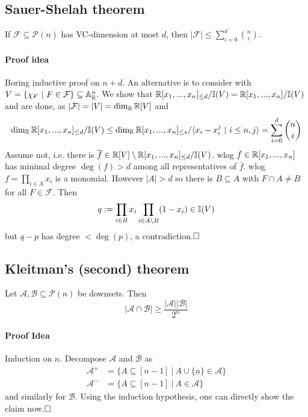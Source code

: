 \subsection{Sauer-Shelah theorem}
If $\mathcal{F} \subseteq \mathcal{P}(n)$ has VC-dimension at most $d$, then $|\mathcal{F}| \leq \sum_{i = 0}^d {n \choose i}$.
\paragraph{Proof idea} Boring inductive proof on $n + d$. An alternative is to consider with $V = \{ \chi_F \ | \ F \in \mathcal{F} \} \subseteq \mathbb{A}^n_{\mathbb{R}}$.
We show that $\mathbb{R}[x_1, ..., x_n]_{\leq d} / \mathbb{I}(V) = \mathbb{R}[x_1, ..., x_n] / \mathbb{I}(V)$ and are done, as $|\mathcal{F}| = |V| = \dim_{\mathbb{R}} \mathbb{R}[V]$ and
\begin{equation*}
    \dim_{\mathbb{R}} \mathbb{R}[x_1, ..., x_n]_{\leq d}/\mathbb{I}(V) \leq \dim_{\mathbb{R}} \mathbb{R}[x_1, ..., x_n]_{\leq s} / \langle x_i - x_i^j \ | \ i \leq n, j \rangle = \sum_{i = 0}^d {n \choose i}
\end{equation*}
Assume not, i.e. there is $\overline{f} \in \mathbb{R}[V] \setminus \mathbb{R}[x_1, ..., x_n]_{\leq d} / \mathbb{I}(V)$.
wlog $f \in \mathbb{R}[x_1, ..., x_n]$ has minimal degree $\deg(f) > d$ among all representatives of $\overline{f}$.
wlog $f = \prod_{i \in A} x_i$ is a monomial.
However $|A| > d$ so there is $B \subseteq A$ with $F \cap A \neq B$ for all $F \in \mathcal{F}$.
Then
\begin{equation*}
    q := \prod_{i \in B} x_i \prod_{i \in A \setminus B} (1 - x_i) \in \mathbb{I}(V)
\end{equation*}
but $q - p$ has degree $< \deg(p)$, a contradiction.$\hfill\square$

\subsection{Kleitman's (second) theorem}
Let $\mathcal{A}, \mathcal{B} \subseteq \mathcal{P}(n)$ be downsets. 
Then
\begin{equation*}
    |\mathcal{A} \cap \mathcal{B}| \geq \frac {|\mathcal{A}| |\mathcal{B}|} {2^n}
\end{equation*}
\paragraph{Proof Idea} Induction on $n$. Decompose $\mathcal{A}$ and $\mathcal{B}$ as
\begin{align*}
    \mathcal{A}^+ &= \{ A \subseteq [n - 1] \ | \ A \cup \{n\} \in \mathcal{A} \} \\
    \mathcal{A}^- &= \{ A \subseteq [n - 1] \ | \ A \in \mathcal{A} \}
\end{align*}
and similarly for $\mathcal{B}$. Using the induction hypothesis, one can directly show the claim now.$\hfill\square$


